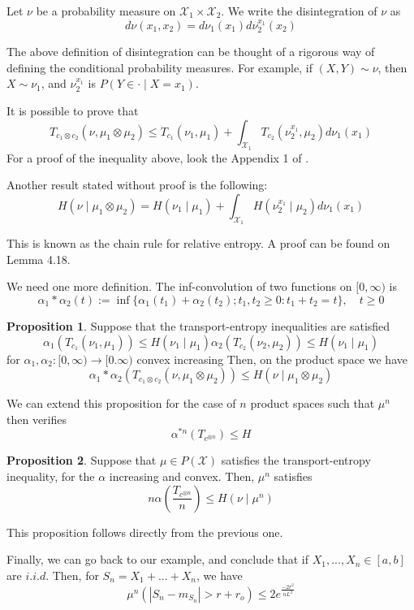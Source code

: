 \documentclass[10pt]{article}
\theoremstyle{definition}
\newtheorem{proposition}{Proposition}
\begin{document}
Let $\nu$ be a probability measure on $\mathcal X_1 \times \mathcal X_2$. We write
the disintegration of $\nu$ as
\begin{equation}
	d\nu(x_1,x_2)	 = d\nu_1(x_1)d\nu_2^{x_1}(x_2)
\end{equation}

The above definition of disintegration can be thought of a rigorous way of defining
the conditional probability measures. For example, if $(X,Y) \sim \nu$,
then $X \sim \nu_1$, and 
$\nu_2^{x_1}$ is $P(Y \in \cdot \mid X = x_1)$.

It is possible to prove that
\begin{equation}
	T_{c_1 \otimes c_2}	(\nu, \mu_1 \otimes \mu_2) \leq
	T_{c_1}	(\nu_1, \mu_1) + \int_{\mathcal X_1} T_{c_2}(\nu_2^{x_1},\mu_2)d\nu_1(x_1)
\end{equation}
For a proof of the inequality above, look the Appendix 1 of \citet{gozlan2010transport}.

Another result stated without proof is the following:
\begin{equation}
	H(\nu\mid \mu_1 \otimes \mu_2)	= H(\nu_1 \mid \mu_1)
	+ \int_{\mathcal X_1} H(\nu_2^{x_1}\mid \mu_2)d\nu_1(x_1)
\end{equation}

This is known as the chain rule for relative entropy. A proof can be found on
\citet{van2014probability} Lemma 4.18.

We need one more definition. The inf-convolution of two functions on $[0,\infty)$ is
$$
\alpha_1 * \alpha_2(t) := \inf\{
\alpha_1(t_1) + \alpha_2(t_2) ; t_1, t_2 \geq 0: t_1 + t_2 = t
\}, \quad t\geq 0
$$

\begin{proposition}
	Suppose that the transport-entropy inequalities are satisfied
	$$
	\alpha_1(T_{c_1}(\nu_1,\mu_1)) \leq H(\nu_1 \mid \mu_1)
	\alpha_2(T_{c_2}(\nu_2,\mu_2)) \leq H(\nu_1 \mid \mu_1)
	$$
	for $\alpha_1, \alpha_2 : [0,\infty) \rightarrow [0.\infty)$ convex increasing
	Then, on the product space we have
	$$
	\alpha_1*\alpha_2(T_{c_1\otimes c_2}(\nu,\mu_1\otimes \mu_2))
	\leq H(\nu \mid \mu_1 \otimes \mu_2)
	$$
\end{proposition}

We can extend this proposition for the case of $n$ product spaces such that $\mu^n$
then verifies
$$
\alpha^{*n}(T_{c^{\otimes n}}) \leq H
$$

\begin{proposition} Suppose that $\mu \in P(\mathcal X)$ satisfies the
transport-entropy inequality, for the $\alpha$ increasing and convex. Then,
$\mu^n$ satisfies
$$
n\alpha
\left(\frac{T_{c^{\otimes n}}}{n}
\right) \leq H(\nu \mid \mu^n)
$$
\end{proposition}
This proposition follows directly from the previous one.

Finally, we can go back to our example, and conclude that if $X_1,...,X_n \in [a,b]$ are
$i.i.d$. Then, for $S_n = X_1 + ... + X_n$, we have
	$$
	\mu^n(|S_n - m_{S_n} | > r + r_o) \leq 2 e^{\frac{- 2r^2}{n L^2}}
	$$



  
  
\end{document}
